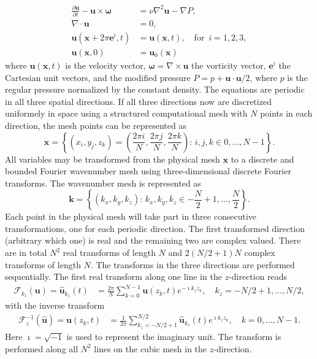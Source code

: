 \documentclass[11pt, oneside]{article}
\begin{document}
\begin{align}
 \frac{\partial \bm{u}}{\partial t} - \bm{u} \times \bm{\omega}   &= \nu \nabla^2 \bm{u} - \nabla{P}, \label{eq:NS} \\
 \nabla \cdot \bm{u} &= 0, \\
 \bm{u}(\bm{x}+2\pi \bm{e}^i, t) &= \bm{u}(\bm{x}, t), \quad \text{for }\, i=1,2,3,\\
 \bm{u}(\bm{x}, 0) &= \bm{u}_0(\bm{x})
\end{align}
where $\bm{u}(\bm{x}, t)$ is the velocity vector, $\bm{\omega}=\nabla \times \bm{u}$ the vorticity vector, $\bm{e}^i$ the Cartesian unit vectors, and the modified pressure $P=p+\bm{u}\cdot \bm{u}/2$, where $p$ is the regular pressure normalized by the constant density. The equations are periodic in all three spatial directions. If all three directions now are discretized uniformely in space using a structured computational mesh with $N$ points in each direction, the mesh points can be represented as
\begin{equation}
\bm{x} = \left\{(x_i, y_j, z_k) = \left( \frac{2\pi i}{N}, \frac{2\pi j}{N}, \frac{2\pi k}{N} \right): \, i,j,k \in 0,\ldots, N-1 \right\}.
\label{eq:realmesh}
\end{equation}
All variables may be transformed from the physical mesh $\bm{x}$ to a discrete and bounded Fourier wavenumber mesh using three-dimensional discrete Fourier transforms. The wavenumber mesh is represented as
\begin{equation}
\bm{k} = \left\{(k_x, k_y, k_z): \, k_x, k_y, k_z \in -\frac{N}{2}+1,\ldots, \frac{N}{2} \right\}.
\label{eq:realmesh}
\end{equation}
Each point in the physical mesh will take part in three consecutive transformations, one for each periodic direction. The first transformed direction (arbitrary which one) is real and the remaining two are complex valued. There are in total $N^2$ real transforms of length $N$ and $2(N/2+1)N$ complex transforms of length $N$. The transforms in the three directions are performed sequentially. The first real transform along one line in the $z$-direction reads
\begin{align}
\mathcal{F}_{k_z}(\bm{u}) = \hat{\bm{u}}_{k_z}(t) &= \frac{2\pi}{N}\sum_{k=0}^{N-1}{\bm{u}({z}_k, t)}e^{-\imath k_z z_k}, \quad k_z=-N/2+1, \ldots, N/2,
\end{align}
with the inverse transform
\begin{align}
\mathcal{F}^{-1}_{z} (\hat{\bm{u}}) =\bm{u}(z_k, t) &= \frac{1}{2\pi}\sum_{k_z=-N/2+1}^{N/2}\hat{\bm{u}}_{k_z}(t)e^{\imath k_z {z}_k}, \quad k=0, \ldots, N-1.
\end{align}
Here $\imath=\sqrt{-1}$ is used to represent the imaginary unit. The transform is performed along all $N^2$ lines on the cubic mesh in the $z$-direction. 
\end{document}
